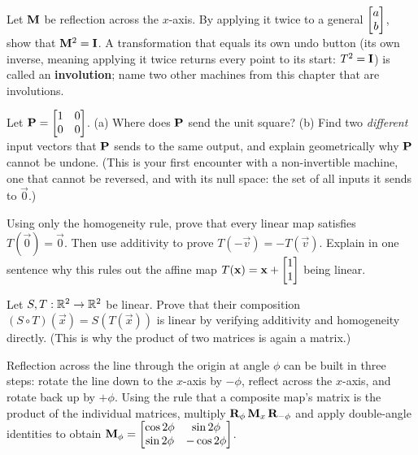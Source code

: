 \begin{exercise}
\label{ch05:ex-involution}
Let $\mathbf{M}$ be reflection across the $x$-axis. By applying it twice to a general
$\begin{bmatrix}a\\b\end{bmatrix}$, show that $\mathbf{M}^2 = \mathbf{I}$. A transformation that equals its
own undo button (its own inverse, meaning applying it twice returns every point
to its start: $T^2 = \mathbf{I}$) is called an \textbf{involution}; name two other
machines from this chapter that are involutions.
\end{exercise}

\begin{exercise}
\label{ch05:ex-collapse}
Let $\mathbf{P} = \begin{bmatrix} 1 & 0 \\ 0 & 0\end{bmatrix}$. (a) Where does
$\mathbf{P}$ send the unit square? (b) Find two \emph{different} input vectors that
$\mathbf{P}$ sends to the same output, and explain geometrically why $\mathbf{P}$ cannot
be undone. (This is your first encounter with a non-invertible machine, one that
cannot be reversed, and with its null space: the set of all inputs it sends to
$\vec{0}$.)
\end{exercise}

\begin{exercise}
\label{ch05:ex-origin}
Using only the homogeneity rule, prove that every linear map satisfies
$T(\vec{0}) = \vec{0}$. Then use additivity to prove $T(-\vec{v}) = -T(\vec{v})$.
Explain in one sentence why this rules out the affine map
$T(\mathbf{x}) = \mathbf{x} + \begin{bmatrix}1\\1\end{bmatrix}$ being linear.
\end{exercise}

\begin{exercise}
\label{ch05:ex-compose-linear}
Let $S, T : \mathbb{R}^2 \to \mathbb{R}^2$ be linear. Prove that their composition $(S \circ
T)(\vec{x}) = S(T(\vec{x}))$ is linear by verifying additivity and homogeneity
directly. (This is why the product of two matrices is again a matrix.)
\end{exercise}

\begin{exercise}
\label{ch05:ex-genreflect}
Reflection across the line through the origin at angle $\phi$ can be built in three
steps: rotate the line down to the $x$-axis by $-\phi$, reflect across the $x$-axis,
and rotate back up by $+\phi$. Using the rule that a composite map's matrix is the
product of the individual matrices, multiply
$\mathbf{R}_{\phi}\,\mathbf{M}_x\,\mathbf{R}_{-\phi}$ and apply double-angle identities to
obtain $\mathbf{M}_\phi = \begin{bmatrix} \cos 2\phi & \sin 2\phi \\ \sin 2\phi &
-\cos 2\phi\end{bmatrix}$.
\end{exercise}

